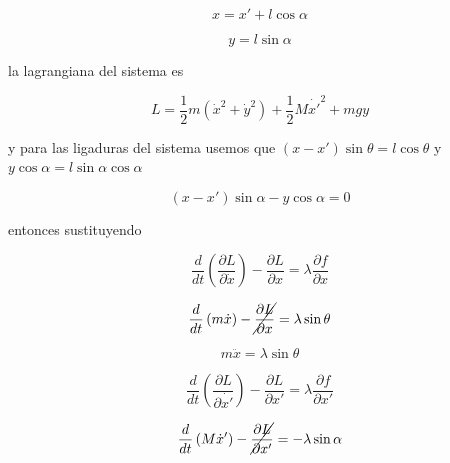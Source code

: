 \documentclass[12pt,a4paper]{article}
\begin{document}
\begin{enumerate}
        \begin{equation*}
            x = x' + l\cos{\alpha}
        \end{equation*}
        
        \begin{equation*}
            y = l\sin{\alpha}
        \end{equation*}
        
        la lagrangiana del sistema es
        
        \begin{equation*}
            L = \frac{1}{2}m (\dot{x}^2 + \dot{y}^2) + \frac{1}{2}M \dot{x'}^2 + mgy
        \end{equation*}
        
        y para las ligaduras del sistema usemos que $(x- x')\sin{\theta} = l \cos{\theta}$ y $y \cos{\alpha} = l \sin{\alpha}\cos{\alpha}$
        
        \begin{equation*}
            (x-x')\sin{\alpha} - y \cos{\alpha} = 0
        \end{equation*}
        
        entonces sustituyendo
        
        \begin{equation*}
            \frac{d}{dt}\left(\frac{\partial L}{\partial \dot{x}}\right) - \frac{\partial L}{\partial x} = \lambda \frac{\partial f}{\partial x}
        \end{equation*}
        
        \begin{equation*}
            \frac{d}{dt}\left(m\dot{x}\right) - \cancel{\frac{\partial L}{\partial x}
            }= \lambda \sin{\theta}
        \end{equation*}
        
        \begin{equation}
            m\ddot{x} = \lambda \sin{\theta}
        \end{equation}
        
        \begin{equation*}
            \frac{d}{dt}\left(\frac{\partial L}{\partial \dot{x'}}\right) - \frac{\partial L}{\partial x'} = \lambda \frac{\partial f}{\partial x'}
        \end{equation*}
        
        \begin{equation*}
            \frac{d}{dt}\left(M\dot{x}'\right) - \cancel{\frac{\partial L}{\partial x'}} =- \lambda \sin{\alpha}
        \end{equation*}
        

\end{enumerate}
\end{document}
